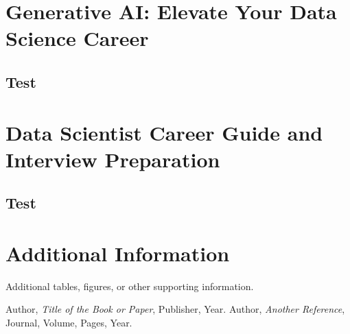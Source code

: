 \documentclass[12pt]{report} %
\begin{document}
	\chapter{Generative AI: Elevate Your Data Science Career}
	\section{Test}
	
	\chapter{Data Scientist Career Guide and Interview Preparation}
	\section{Test}
	
	
	\appendix
	\chapter{Additional Information}
	Additional tables, figures, or other supporting information.
	
	\begin{thebibliography}{9}
		 Author, \emph{Title of the Book or Paper}, Publisher, Year.
		 Author, \emph{Another Reference}, Journal, Volume, Pages, Year.
	\end{thebibliography}
	
\end{document}
